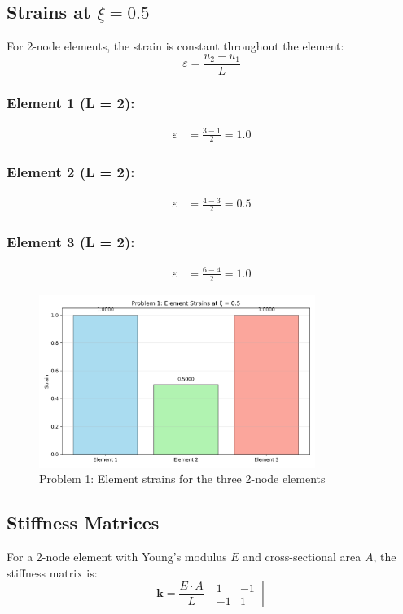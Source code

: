 \documentclass[12pt,a4paper]{article}
\begin{document}
\subsection{Strains at $\xi = 0.5$}
For 2-node elements, the strain is constant throughout the element:
\begin{equation}
\varepsilon = \frac{u_2 - u_1}{L}
\end{equation}

\subsubsection*{Element 1 (L = 2):}
\begin{align}
\varepsilon &= \frac{3 - 1}{2} = 1.0
\end{align}

\subsubsection*{Element 2 (L = 2):}
\begin{align}
\varepsilon &= \frac{4 - 3}{2} = 0.5
\end{align}

\subsubsection*{Element 3 (L = 2):}
\begin{align}
\varepsilon &= \frac{6 - 4}{2} = 1.0
\end{align}

\begin{figure}[H]
\centering
\includegraphics[width=0.8\textwidth]{figures/ps3_problem1_strains.png}
\caption{Problem 1: Element strains for the three 2-node elements}
\label{fig:problem1_strains}
\end{figure}

\subsection{Stiffness Matrices}
For a 2-node element with Young's modulus $E$ and cross-sectional area $A$, the stiffness matrix is:
\begin{equation}
\mathbf{k} = \frac{E \cdot A}{L} \begin{bmatrix} 1 & -1 \\ -1 & 1 \end{bmatrix}
\end{equation}
\end{document}
